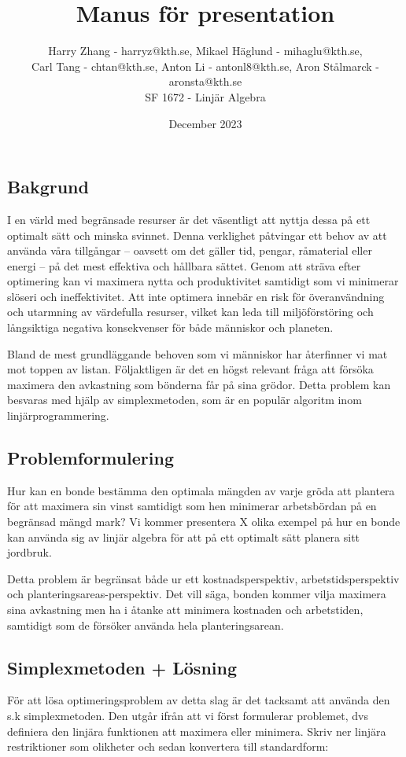 \documentclass{article}
\title{Manus för presentation}
\author{
    Harry Zhang - harryz@kth.se, Mikael Häglund - mihaglu@kth.se, \\
    Carl Tang - chtan@kth.se, Anton Li - antonl8@kth.se, Aron Stålmarck - aronsta@kth.se \\
    SF 1672 - Linjär Algebra
}
\date{December 2023}
\begin{document}
\maketitle
\subsection{Bakgrund}
I en värld med begränsade resurser är det väsentligt att nyttja dessa på ett optimalt sätt och minska svinnet. Denna verklighet påtvingar ett behov av att använda våra tillgångar – oavsett om det gäller tid, pengar, råmaterial eller energi – på det mest effektiva och hållbara sättet. Genom att sträva efter optimering kan vi maximera nytta och produktivitet samtidigt som vi minimerar slöseri och ineffektivitet. Att inte optimera innebär en risk för överanvändning och utarmning av värdefulla resurser, vilket kan leda till miljöförstöring och långsiktiga negativa konsekvenser för både människor och planeten.

Bland de mest grundläggande behoven som vi människor har återfinner vi mat mot toppen av listan. Följaktligen är det en högst relevant fråga att försöka maximera den avkastning som bönderna får på sina grödor. Detta problem kan besvaras med hjälp av simplexmetoden, som är en populär algoritm inom linjärprogrammering.

\subsection{Problemformulering}
Hur kan en bonde bestämma den optimala mängden av varje gröda att plantera för att maximera sin vinst samtidigt som hen minimerar arbetsbördan på en begränsad mängd mark? Vi kommer presentera X olika exempel på hur en bonde kan använda sig av linjär algebra för att på ett optimalt sätt planera sitt jordbruk. 

Detta problem är begränsat både ur ett kostnadsperspektiv, arbetstidsperspektiv och planteringsareas-perspektiv. Det vill säga, bonden kommer vilja maximera sina avkastning men ha i åtanke att minimera kostnaden och arbetstiden, samtidigt som de försöker använda hela planteringsarean.  %

\subsection{Simplexmetoden + Lösning}
För att lösa optimeringsproblem av detta slag är det tacksamt att använda den s.k simplexmetoden. Den utgår ifrån att vi först formulerar problemet, dvs definiera den linjära funktionen att maximera eller minimera. Skriv ner linjära restriktioner som olikheter och sedan konvertera till standardform:
\end{document}

